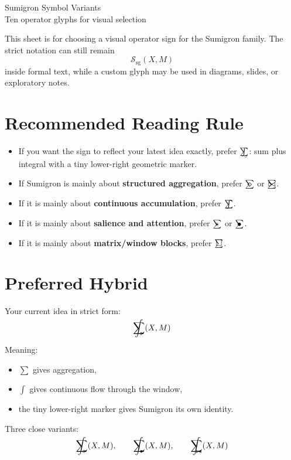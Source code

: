 \documentclass[12pt]{article}
\newcommand{\sgoverlay}[2]{\mathop{\mathchoice
  {\ooalign{\hfil$\displaystyle\sum$\hfil\cr\hfil$#1$\hfil\cr}}
  {\ooalign{\hfil$\textstyle\sum$\hfil\cr\hfil$#2$\hfil\cr}}
  {\ooalign{\hfil$\scriptstyle\sum$\hfil\cr\hfil$#2$\hfil\cr}}
  {\ooalign{\hfil$\scriptscriptstyle\sum$\hfil\cr\hfil$#2$\hfil\cr}}
}}
\newcommand{\sgsumintright}[1]{\mathop{\mathchoice
  {\ooalign{
    \hfil$\displaystyle\sum$\hfil\cr
    \hfil$\displaystyle\int$\hfil\cr
    \hidewidth\raisebox{-1.35ex}{\kern1.25ex$\scriptstyle #1$}\hidewidth\cr
  }}
  {\ooalign{
    \hfil$\textstyle\sum$\hfil\cr
    \hfil$\textstyle\int$\hfil\cr
    \hidewidth\raisebox{-1.00ex}{\kern1.00ex$\scriptscriptstyle #1$}\hidewidth\cr
  }}
  {\ooalign{
    \hfil$\scriptstyle\sum$\hfil\cr
    \hfil$\scriptstyle\int$\hfil\cr
    \hidewidth\raisebox{-0.75ex}{\kern0.75ex$\scriptscriptstyle #1$}\hidewidth\cr
  }}
  {\ooalign{
    \hfil$\scriptscriptstyle\sum$\hfil\cr
    \hfil$\scriptscriptstyle\int$\hfil\cr
    \hidewidth\raisebox{-0.60ex}{\kern0.55ex$\scriptscriptstyle #1$}\hidewidth\cr
  }}
}}
\newcommand{\sgdiamond}{\sgoverlay{\displaystyle\diamond}{\textstyle\diamond}}
\newcommand{\sgint}{\sgoverlay{\displaystyle\int}{\textstyle\int}}
\newcommand{\sgstar}{\sgoverlay{\displaystyle\star}{\textstyle\star}}
\newcommand{\sgsquare}{\sgoverlay{\displaystyle\square}{\textstyle\square}}
\newcommand{\sgbowtie}{\sgoverlay{\displaystyle\bowtie}{\textstyle\bowtie}}
\newcommand{\sgbullet}{\sgoverlay{\displaystyle\bullet}{\textstyle\bullet}}
\newcommand{\sgfinaldiamond}{\sgsumintright{\diamond}}
\newcommand{\sgfinalbullet}{\sgsumintright{\bullet}}
\newcommand{\sgfinalbowtie}{\sgsumintright{\bowtie}}
\begin{document}
\begin{center}
{\LARGE Sumigron Symbol Variants}\\[0.4em]
{\large Ten operator glyphs for visual selection}
\end{center}

\vspace{0.6em}

\noindent
This sheet is for choosing a visual operator sign for the Sumigron family. The strict notation can still remain
\[
\mathcal{S}_{\mathrm{sg}}(X,M)
\]
inside formal text, while a custom glyph may be used in diagrams, slides, or exploratory notes.

\section*{Recommended Reading Rule}
\begin{itemize}
\item If you want the sign to reflect your latest idea exactly, prefer \(\sgfinaldiamond\): sum plus integral with a tiny lower-right geometric marker.
\item If Sumigron is mainly about \textbf{structured aggregation}, prefer \(\sgdiamond\) or \(\sgbowtie\).
\item If it is mainly about \textbf{continuous accumulation}, prefer \(\sgint\).
\item If it is mainly about \textbf{salience and attention}, prefer \(\sgstar\) or \(\sgbullet\).
\item If it is mainly about \textbf{matrix/window blocks}, prefer \(\sgsquare\).
\end{itemize}

\section*{Preferred Hybrid}
Your current idea in strict form:
\[
\sgfinaldiamond(X,M)
\]

\noindent
Meaning:
\begin{itemize}
\item \(\sum\) gives aggregation,
\item \(\int\) gives continuous flow through the window,
\item the tiny lower-right marker gives Sumigron its own identity.
\end{itemize}

\noindent
Three close variants:
\[
\sgfinaldiamond(X,M), \qquad
\sgfinalbullet(X,M), \qquad
\sgfinalbowtie(X,M)
\]
\end{document}
